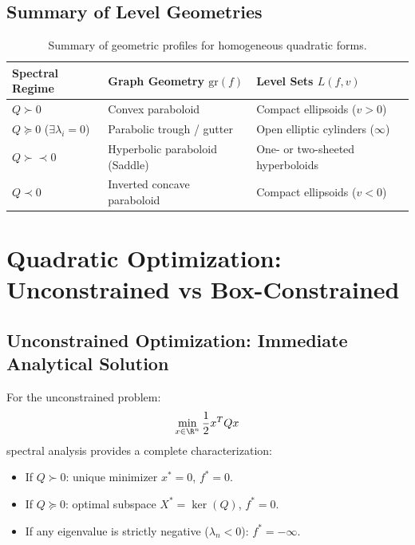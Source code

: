 \subsection{Summary of Level Geometries}
\begin{table}[H]
\centering
\small
\renewcommand{\arraystretch}{1.3}
\begin{tabularx}{\textwidth}{l X X}
\toprule
\textbf{Spectral Regime} & \textbf{Graph Geometry $\text{gr}(f)$} & \textbf{Level Sets $L(f, v)$} \\
\midrule
$Q \succ 0$ & Convex paraboloid & Compact ellipsoids ($v > 0$) \\
$Q \succeq 0$ ($\exists \lambda_i = 0$) & Parabolic trough / gutter & Open elliptic cylinders ($\infty$) \\
$Q \succ\prec 0$ & Hyperbolic paraboloid (Saddle) & One- or two-sheeted hyperboloids \\
$Q \prec 0$ & Inverted concave paraboloid & Compact ellipsoids ($v < 0$) \\
\bottomrule
\end{tabularx}
\caption{Summary of geometric profiles for homogeneous quadratic forms.}
\label{tab:level-geometries-en}
\end{table}


\FloatBarrier
\section{Quadratic Optimization: Unconstrained vs Box-Constrained}
\label{sec:opt-quadratic-unconstrained-vs-box-np-en}

\subsection{Unconstrained Optimization: Immediate Analytical Solution}
For the unconstrained problem:
\begin{equation}
\min_{x \in \R^n} \frac{1}{2} x^T Q x
\end{equation}
spectral analysis provides a complete characterization:
\begin{itemize}
    \item If $Q \succ 0$: unique minimizer $x^* = 0$, $f^* = 0$.
    \item If $Q \succeq 0$: optimal subspace $X^* = \ker(Q)$, $f^* = 0$.
    \item If any eigenvalue is strictly negative ($\lambda_n < 0$): $f^* = -\infty$.
\end{itemize}

